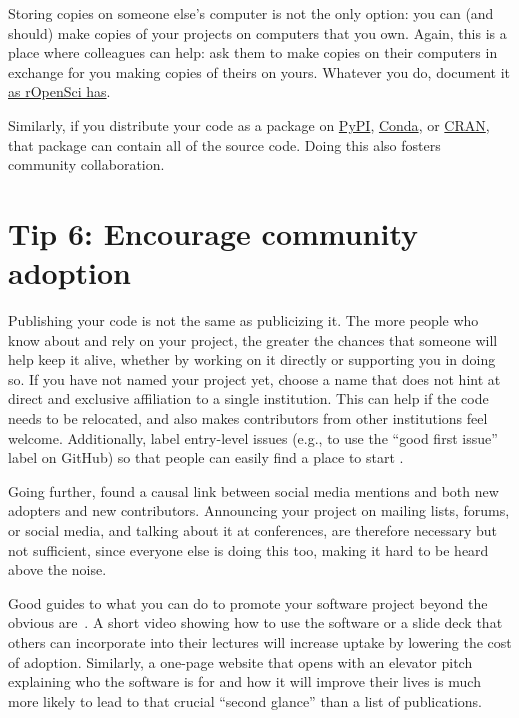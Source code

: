 \documentclass[10pt,letterpaper]{article}
\begin{document}
Storing copies on someone else's computer is not the only option: you can (and should) make copies of your projects on computers that you own. Again, this is a place where colleagues can help: ask them to make copies on their computers in exchange for you making copies of theirs on yours.
Whatever you do, document it \href{https://ropensci.org/blog/2022/03/22/safeguards-and-backups-for-github-organizations/}{as rOpenSci has}.

Similarly, if you distribute your code as a package on \href{https://pypi.org/}{PyPI},
\href{https://anaconda.org/anaconda/conda}{Conda}, or \href{https://cran.r-project.org/}{CRAN}, that package can contain all of the source code. Doing this also fosters community collaboration.

\section*{Tip 6: Encourage community adoption}

Publishing your code is not the same as publicizing it.
The more people who know about and rely on your project, the greater the chances that someone will help keep it alive, whether by working on it directly or supporting you in doing so.
If you have not named your project yet, choose a name that does not hint at direct and exclusive affiliation to a single institution.
This can help if the code needs to be relocated, and also makes contributors from other institutions feel welcome.
Additionally, label entry-level issues (e.g., to use the ``good first issue'' label on GitHub) so that people can easily find a place to start \cite{Steinmacher2015}.

Going further, \cite{Fang2022} found a causal link between social media mentions and both new adopters and new contributors.
Announcing your project on mailing lists, forums, or social media, and talking about it at conferences, are therefore necessary but not sufficient, since everyone else is doing this too, making it hard to be heard above the noise.

Good guides to what you can do to promote your software project beyond the obvious are~\cite{Kuchner2011,BelliniSaibene2024}.
A short video showing how to use the software or a slide deck that others can incorporate into their lectures
will increase uptake by lowering the cost of adoption. Similarly, a one-page website that opens with an elevator pitch
explaining who the software is for and how it will improve their lives is much more likely to lead to that crucial ``second glance''
than a list of publications.
\end{document}
